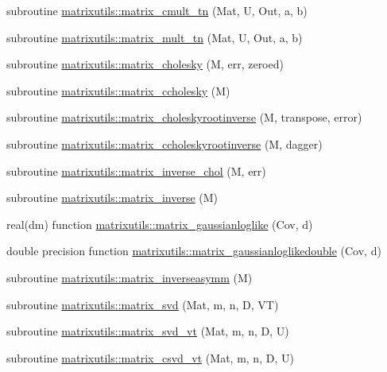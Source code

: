 \begin{DoxyCompactItemize}
\item 
subroutine \mbox{\hyperlink{namespacematrixutils_a7c5f8b5e283bec1dcdcc4b82abbebd47}{matrixutils\+::matrix\+\_\+cmult\+\_\+tn}} (Mat, U, Out, a, b)
\item 
subroutine \mbox{\hyperlink{namespacematrixutils_a13557cd7745827af9e6873d3dbba3a1f}{matrixutils\+::matrix\+\_\+mult\+\_\+tn}} (Mat, U, Out, a, b)
\item 
subroutine \mbox{\hyperlink{namespacematrixutils_a380ecdd4310ae2f91be911a45516df12}{matrixutils\+::matrix\+\_\+cholesky}} (M, err, zeroed)
\item 
subroutine \mbox{\hyperlink{namespacematrixutils_ad7a37503ef0aeeef3585caccc253c428}{matrixutils\+::matrix\+\_\+ccholesky}} (M)
\item 
subroutine \mbox{\hyperlink{namespacematrixutils_acda49677dcf7603b255acba37dda9b92}{matrixutils\+::matrix\+\_\+choleskyrootinverse}} (M, transpose, error)
\item 
subroutine \mbox{\hyperlink{namespacematrixutils_a3d8668e32abacfbeeeaaca90c120a129}{matrixutils\+::matrix\+\_\+ccholeskyrootinverse}} (M, dagger)
\item 
subroutine \mbox{\hyperlink{namespacematrixutils_a663d1886940de1ea811bab15859db116}{matrixutils\+::matrix\+\_\+inverse\+\_\+chol}} (M, err)
\item 
subroutine \mbox{\hyperlink{namespacematrixutils_aac7ea35062daeadd8fb4ebc86cb42e7a}{matrixutils\+::matrix\+\_\+inverse}} (M)
\item 
real(dm) function \mbox{\hyperlink{namespacematrixutils_a5a3ede7fff09728b5cacb5a559ab936f}{matrixutils\+::matrix\+\_\+gaussianloglike}} (Cov, d)
\item 
double precision function \mbox{\hyperlink{namespacematrixutils_ab48ad701f7ef749e5bea654c83ac4544}{matrixutils\+::matrix\+\_\+gaussianloglikedouble}} (Cov, d)
\item 
subroutine \mbox{\hyperlink{namespacematrixutils_af319573ea9284b8ab1e745f9610b36f6}{matrixutils\+::matrix\+\_\+inverseasymm}} (M)
\item 
subroutine \mbox{\hyperlink{namespacematrixutils_a7960d8813f71cc715ba85ffba471dd38}{matrixutils\+::matrix\+\_\+svd}} (Mat, m, n, D, VT)
\item 
subroutine \mbox{\hyperlink{namespacematrixutils_a295b572473f10f878fb8d3fc7b8d06f1}{matrixutils\+::matrix\+\_\+svd\+\_\+vt}} (Mat, m, n, D, U)
\item 
subroutine \mbox{\hyperlink{namespacematrixutils_a536eb03269736dd2f4c33b0978211583}{matrixutils\+::matrix\+\_\+csvd\+\_\+vt}} (Mat, m, n, D, U)

\end{DoxyCompactItemize}
